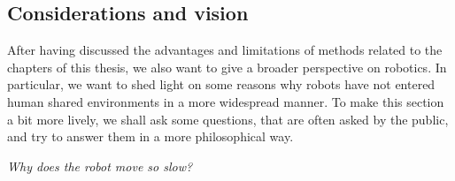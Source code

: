 

\subsection{Considerations and vision}
\label{sec:discussion_vision}

After having discussed the advantages and limitations of
methods related to the chapters of this thesis, we also want
to give a broader perspective on robotics. In particular, we
want to shed light on some reasons why robots have not
entered human shared environments in a more widespread
manner. To make this section a bit more lively, we shall ask
some questions, that are often asked by the public, and
try to answer them in a more philosophical way.


\textit{Why does the robot move so slow?}

